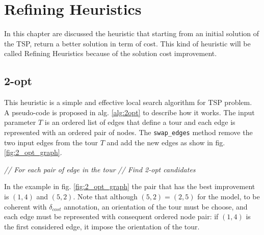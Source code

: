 \chapter{Refining Heuristics}
In this chapter are discussed the heuristic that starting from an initial solution of the TSP, return a better solution in term of cost. This kind of heuristic will be called Refining Heuristics because of the solution cost improvement. 

\section{2-opt} \label{sec:best_2_opt}

This heuristic is a simple and effective local search algorithm for TSP problem.\\
A pseudo-code is proposed in alg. \ref{alg:2opt} to describe how it works. The input parameter $ T $ is an ordered list of edges that define a tour and each edge is represented with an ordered pair of nodes. The \texttt{swap\_edges} method remove the two input edges from the tour $ T $ and add the new edges as show in fig. \ref{fig:2_opt_graph}.

\begin{algorithm}
	\caption{}\label{alg:2opt}
	\begin{algorithmic}[1]
			 \textit{ // For each pair of edge in the tour}
				\EndIf
				 \textit{ // Find 2-opt candidates}
				\EndIf
			\EndFor
		\EndFor
	\EndProcedure
	\end{algorithmic}
\end{algorithm}

In the example in fig. \ref{fig:2_opt_graph} the pair that has the best improvement is $ (1,4) $ and $ (5,2) $. Note that although $ (5,2) = (2,5) $ for the model, to be coherent with $ \delta_{cost} $ annotation, an orientation of the tour must be choose, and each edge must be represented with consequent ordered node pair: if $ (1,4) $ is the first considered edge, it impose the orientation of the tour.

